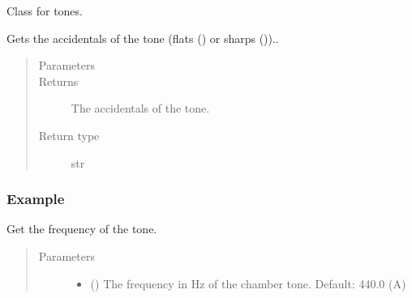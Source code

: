 \documentclass[letterpaper,10pt,english]{sphinxmanual}
\begin{document}
\begin{fulllineitems}
\label{\detokenize{api:main.Tone}}
Class for tones.

\begin{fulllineitems}
\label{\detokenize{api:main.Tone.get_accidentals}}
Gets the accidentals of the tone (flats () or sharps (\sphinxtitleref{\#}))..
\begin{quote}\begin{description}
\item[{Parameters}] \leavevmode
{} \textendash{} 

\item[{Returns}] \leavevmode
The accidentals of the tone.

\item[{Return type}] \leavevmode
str

\end{description}\end{quote}
\subsubsection*{Example}

\begin{sphinxVerbatim}[commandchars=\\\{\}]
   
\end{sphinxVerbatim}

\end{fulllineitems}


\begin{fulllineitems}
\label{\detokenize{api:main.Tone.get_frequency}}
Get the frequency of the tone.
\begin{quote}\begin{description}
\item[{Parameters}] \leavevmode\begin{itemize}
\item {} 
 () \textendash{} The frequency in Hz of the chamber tone. Default: 440.0 (A)


\end{itemize}
\end{description}
\end{quote}
\end{fulllineitems}
\end{fulllineitems}
\end{document}
